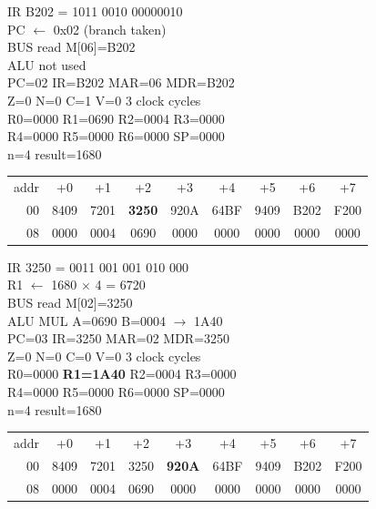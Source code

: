 \noindent\begin{tcolorbox}[stepbox, title={Step 22 \hfill PC 06 \quad BNE loop}]
\textcolor{dim}{IR} B202 = 1011 0010 00000010\\
PC $\leftarrow$ 0x02 (branch taken)\\
\textcolor{dim}{BUS} read M[06]=B202\\
\textcolor{dim}{ALU} \textcolor{dim}{not used}\\
PC=02 IR=B202 MAR=06 MDR=B202\\
Z=0 N=0 C=1 V=0 \hfill \textcolor{dim}{3 clock cycles}\\
R0=0000 R1=0690 R2=0004 R3=0000\\
R4=0000 R5=0000 R6=0000 SP=0000\\
\textcolor{dim}{n=4  result=1680}\\[1pt]
{\setlength{\tabcolsep}{1.6pt}\begin{tabular}{@{}r*{8}{c}@{}}
\textcolor{dim}{addr} & \textcolor{dim}{+0} & \textcolor{dim}{+1} & \textcolor{dim}{+2} & \textcolor{dim}{+3} & \textcolor{dim}{+4} & \textcolor{dim}{+5} & \textcolor{dim}{+6} & \textcolor{dim}{+7}\\
\textcolor{dim}{00} & 8409 & 7201 & \cellcolor{pcc}\textbf{3250} & 920A & 64BF & 9409 & B202 & F200\\
\textcolor{dim}{08} & 0000 & \cellcolor{datac}0004 & \cellcolor{datac}0690 & 0000 & 0000 & 0000 & 0000 & 0000\\
\end{tabular}}
\end{tcolorbox}\hfill\begin{tcolorbox}[stepbox, title={Step 23 \hfill PC 02 \quad MUL R1, R1, R2}]
\textcolor{dim}{IR} 3250 = 0011 001 001 010 000\\
R1 $\leftarrow$ 1680 $\times$ 4 = 6720\\
\textcolor{dim}{BUS} read M[02]=3250\\
\textcolor{dim}{ALU} MUL A=0690 B=0004 $\rightarrow$ 1A40\\
PC=03 IR=3250 MAR=02 MDR=3250\\
Z=0 N=0 C=0 V=0 \hfill \textcolor{dim}{3 clock cycles}\\
R0=0000 \textcolor{wrt}{\textbf{R1=1A40}} R2=0004 R3=0000\\
R4=0000 R5=0000 R6=0000 SP=0000\\
\textcolor{dim}{n=4  result=1680}\\[1pt]
{\setlength{\tabcolsep}{1.6pt}\begin{tabular}{@{}r*{8}{c}@{}}
\textcolor{dim}{addr} & \textcolor{dim}{+0} & \textcolor{dim}{+1} & \textcolor{dim}{+2} & \textcolor{dim}{+3} & \textcolor{dim}{+4} & \textcolor{dim}{+5} & \textcolor{dim}{+6} & \textcolor{dim}{+7}\\
\textcolor{dim}{00} & 8409 & 7201 & 3250 & \cellcolor{pcc}\textbf{920A} & 64BF & 9409 & B202 & F200\\
\textcolor{dim}{08} & 0000 & \cellcolor{datac}0004 & \cellcolor{datac}0690 & 0000 & 0000 & 0000 & 0000 & 0000\\
\end{tabular}}
\end{tcolorbox}\par\vspace{3pt}
